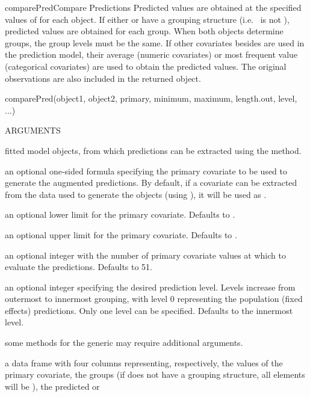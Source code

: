 \documentclass[pdftex]{article} \usepackage{url,graphicx}
\begin{document}
\begin{Helpfile}{comparePred}{Compare Predictions}
Predicted values are obtained at the specified values of
 for each object. If either  or
 have a grouping structure
(i.e.\  is not ), predicted values
are obtained for each group. When both objects determine groups, the
group levels must be the same. If other covariates besides
 are used in the prediction model, their average
(numeric covariates) or most frequent value (categorical covariates)
are used to obtain the predicted values. The original observations are
also included in the returned object.
\begin{Example}
comparePred(object1, object2, primary, minimum, maximum, 
            length.out, level, ...) 
\end{Example}
\begin{Argument}{ARGUMENTS}
\item[\Co{object1,object2:}]
fitted model objects, from which predictions can
be extracted using the  method.
\item[\Co{primary:}]
an optional one-sided formula specifying the primary
covariate to be used to generate the augmented predictions. By
default, if a  covariate can be extracted from the data used to generate
the objects (using ), it will be used as
.
\item[\Co{minimum:}]
an optional lower limit for the primary
covariate. Defaults to .
\item[\Co{maximum:}]
an optional upper limit for the primary
covariate. Defaults to .
\item[\Co{length.out:}]
an optional integer with the number of primary
covariate values at which to evaluate the predictions. Defaults to
51.
\item[\Co{level:}]
an optional integer specifying the desired
prediction level. Levels increase from outermost to innermost
grouping, with level 0 representing the population (fixed effects)
predictions. Only one level can be specified. Defaults to the
innermost level.
\item[\Co{...:}]
some methods for the generic may require additional
arguments.
\end{Argument}
a data frame with four columns representing, respectively, the values
of the primary covariate, the groups (if  does not have a
grouping structure, all elements will be ), the predicted or

\end{Helpfile}
\end{document}
